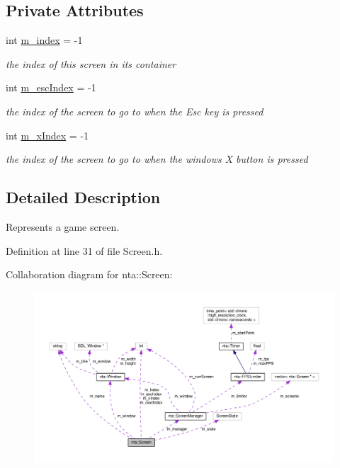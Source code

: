 \subsection*{Private Attributes}
\begin{DoxyCompactItemize}
\item 
\mbox{\label{classnta_1_1Screen_a60c7a5b3894ec6f42042dac0f1f3c54c}} 
int \hyperlink{classnta_1_1Screen_a60c7a5b3894ec6f42042dac0f1f3c54c}{m\+\_\+index} = -\/1
\begin{DoxyCompactList}\small\item\em the index of this screen in its container \end{DoxyCompactList}\item 
\mbox{\label{classnta_1_1Screen_a5e38ecb4efb8ea6487774052f9d3281d}} 
int \hyperlink{classnta_1_1Screen_a5e38ecb4efb8ea6487774052f9d3281d}{m\+\_\+esc\+Index} = -\/1
\begin{DoxyCompactList}\small\item\em the index of the screen to go to when the Esc key is pressed \end{DoxyCompactList}\item 
\mbox{\label{classnta_1_1Screen_afba24e281f497022a32416f707785b9c}} 
int \hyperlink{classnta_1_1Screen_afba24e281f497022a32416f707785b9c}{m\+\_\+x\+Index} = -\/1
\begin{DoxyCompactList}\small\item\em the index of the screen to go to when the window\textquotesingle{}s X button is pressed \end{DoxyCompactList}\end{DoxyCompactItemize}


\subsection{Detailed Description}
Represents a game screen. 

Definition at line 31 of file Screen.\+h.



Collaboration diagram for nta\+:\+:Screen\+:
\nopagebreak
\begin{figure}[H]
\begin{center}
\leavevmode
\includegraphics[width=350pt]{d4/df6/classnta_1_1Screen__coll__graph}
\end{center}
\end{figure}


